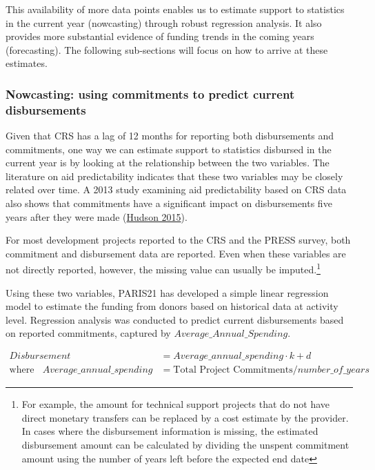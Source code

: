 \documentclass[
]{article}
\begin{document}
This availability of more data points enables us to estimate support to statistics in the current year
(nowcasting) through robust regression analysis. It also provides more substantial evidence of funding
trends in the coming years (forecasting). The following sub‐sections will focus on how to arrive at
these estimates.

\hypertarget{nowcasting-using-commitments-to-predict-current-disbursements}{%
\subsubsection{Nowcasting: using commitments to predict current disbursements}\label{nowcasting-using-commitments-to-predict-current-disbursements}}

Given that CRS has a lag of 12 months for reporting both disbursements and commitments, one way
we can estimate support to statistics disbursed in the current year is by looking at the relationship
between the two variables. The literature on aid predictability indicates that these two variables may
be closely related over time. A 2013 study examining aid predictability based on CRS data also shows
that commitments have a significant impact on disbursements five years after they were made
(\protect\hyperlink{ref-Hudson}{Hudson 2015}).

For most development projects reported to the CRS and the PRESS survey, both commitment and
disbursement data are reported. Even when these variables are not directly reported, however, the
missing value can usually be imputed.\footnote{For example, the amount for technical support projects that do not have direct monetary transfers can be
  replaced by a cost estimate by the provider. In cases where the disbursement information is missing, the
  estimated disbursement amount can be calculated by dividing the unspent commitment amount using the
  number of years left before the expected end date}

Using these two variables, PARIS21 has developed a simple linear regression model to estimate the
funding from donors based on historical data at activity level. Regression analysis was conducted to
predict current disbursements based on reported commitments, captured by
\(Average\_Annual\_Spending\).

\begin{align*}
Disbursement &= Average\_annual\_spending \cdot k + d \\
\text{where} ~~~~ Average\_annual\_spending &= \text{Total Project Commitments}/number\_of\_years
\end{align*}
\end{document}
